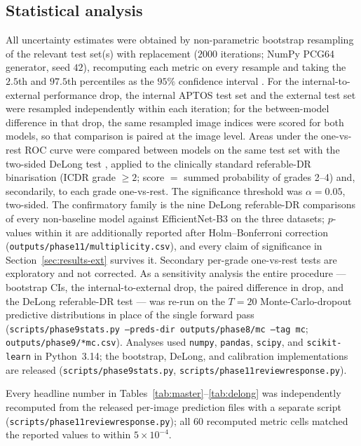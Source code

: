 \documentclass[journal]{IEEEtran}
\renewcommand{\_}{\origunderscore\allowbreak}
\begin{document}
\subsection{Statistical analysis}
\label{sec:methods-stats}

All uncertainty estimates were obtained by non-parametric bootstrap resampling of
the relevant test set(s) with replacement ($2000$ iterations; NumPy PCG64
generator, seed $42$), recomputing each metric on every resample and taking the
$2.5$th and $97.5$th percentiles as the $95\%$ confidence interval
\cite{efron1994bootstrap}. For the internal-to-external performance drop, the
internal APTOS test set and the external test set were resampled independently
within each iteration; for the between-model difference in that drop, the same
resampled image indices were scored for both models, so that comparison is paired
at the image level. Areas under the one-vs-rest ROC curve were compared between
models on the same test set with the two-sided DeLong test
\cite{delong1988,sun2014fast}, applied to the clinically standard referable-DR
binarisation (ICDR grade $\geq 2$; score $=$ summed probability of grades 2--4)
and, secondarily, to each grade one-vs-rest. The significance threshold was
$\alpha=0.05$, two-sided. The confirmatory family is the nine DeLong referable-DR
comparisons of every non-baseline model against EfficientNet-B3 on the three
datasets; $p$-values within it are additionally reported after Holm--Bonferroni
correction (\texttt{outputs/\allowbreak{}phase11/\allowbreak{}multiplicity.csv}), and every claim of
significance in Section~\ref{sec:results-ext} survives it. Secondary per-grade
one-vs-rest tests are exploratory and not corrected. As a sensitivity analysis
the entire procedure --- bootstrap CIs, the internal-to-external drop, the paired
difference in drop, and the DeLong referable-DR test --- was re-run on the
$T=20$ Monte-Carlo-dropout predictive distributions in place of the single
forward pass (\texttt{scripts/\allowbreak{}phase9\_stats.py --preds-dir outputs/\allowbreak{}phase8/\allowbreak{}mc
--tag mc}; \texttt{outputs/\allowbreak{}phase9/\allowbreak{}*\_mc.csv}). Analyses used \texttt{numpy},
\texttt{pandas}, \texttt{scipy}, and \texttt{scikit-learn} in Python~3.14; the
bootstrap, DeLong, and calibration implementations are released
(\texttt{scripts/\allowbreak{}phase9\_stats.py}, \texttt{scripts/\allowbreak{}phase11\_review\_response.py}).

Every headline number in Tables~\ref{tab:master}--\ref{tab:delong} was
independently recomputed from the released per-image prediction files with a
separate script (\texttt{scripts/\allowbreak{}phase11\_review\_response.py}); all $60$
recomputed metric cells matched the reported values to within $5\times10^{-4}$.
\end{document}
